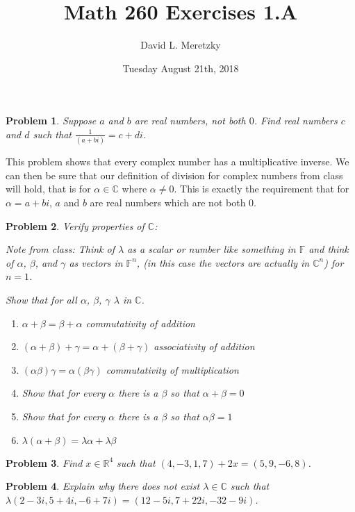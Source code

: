 \documentclass{article}
\title{ \vspace{-10ex} %
Math 260 Exercises 1.A
}
\author{David L. Meretzky
}
\date{%
Tuesday August 21th, 2018
}
\theoremstyle{problemstyle}
\newtheorem{problem}{Problem}
\theoremstyle{problemstyle}
\begin{document}
\maketitle

\begin{problem}
Suppose $a$ and $b$ are real numbers, not both $0$. Find real numbers $c$ and $d$ such that $\frac{1}{(a+bi)} = c+di$.
\end{problem}

This problem shows that every complex number has a multiplicative inverse. We can then be sure that our definition of division for complex numbers from class will hold, that is for $\alpha \in \mathbb{C}$ where $\alpha \neq 0$. This is exactly the requirement that for $\alpha = a+bi$, $a$ and $b$ are real numbers which are not both $0$.

\begin{problem}
Verify properties of $\mathbb{C}$: 

Note from class: Think of $\lambda$ as a scalar or number like something in $\mathbb{F}$ and think of $\alpha$, $\beta$, and $\gamma$ as vectors in $\mathbb{F}^n$, (in this case the vectors are actually in $\mathbb{C}^n$) for $n = 1$.  

Show that for all $\alpha$, $\beta$, $\gamma$ $\lambda$ in $\mathbb{C}$. 
\begin{enumerate}
\item $\alpha + \beta = \beta + \alpha$  commutativity of addition
\item $(\alpha+\beta)+\gamma = \alpha+(\beta + \gamma)$ associativity of addition
\item $(\alpha\beta)\gamma = \alpha(\beta\gamma)$ commutativity of multiplication
\item Show that for every $\alpha$ there is a $\beta$ so that $\alpha + \beta = 0$
\item Show that for every $\alpha$ there is a $\beta$ so that $\alpha\beta = 1$
\item $\lambda(\alpha+\beta) = \lambda\alpha +\lambda\beta$
\end{enumerate}
\end{problem}


\begin{problem}
Find $x \in \mathbb{R}^4$ such that $(4,-3,1,7)+2x = (5,9,-6,8)$.
\end{problem}


\begin{problem}
Explain why there does not exist $\lambda \in \mathbb{C}$ such that $\lambda(2-3i,5+4i,-6+7i) = (12-5i,7+22i,-32-9i)$.
\end{problem}
\end{document}
